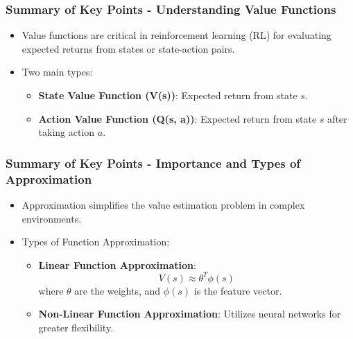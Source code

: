 \documentclass[aspectratio=169]{beamer}
\begin{document}
\begin{frame}[fragile]
    \frametitle{Summary of Key Points - Understanding Value Functions}
    \begin{itemize}
        \item Value functions are critical in reinforcement learning (RL) for evaluating expected returns from states or state-action pairs.
        \item Two main types:
        \begin{itemize}
            \item \textbf{State Value Function (V(s))}: Expected return from state \( s \).
            \item \textbf{Action Value Function (Q(s, a))}: Expected return from state \( s \) after taking action \( a \).
        \end{itemize}
    \end{itemize}
\end{frame}

\begin{frame}[fragile]
    \frametitle{Summary of Key Points - Importance and Types of Approximation}
    \begin{itemize}
        \item Approximation simplifies the value estimation problem in complex environments.
        \item Types of Function Approximation:
        \begin{itemize}
            \item \textbf{Linear Function Approximation}:
            \begin{equation}
                V(s) \approx \theta^T \phi(s)
            \end{equation}
            where \( \theta \) are the weights, and \( \phi(s) \) is the feature vector.
            \item \textbf{Non-Linear Function Approximation}: Utilizes neural networks for greater flexibility.
        \end{itemize}
    \end{itemize}
\end{frame}
\end{document}
